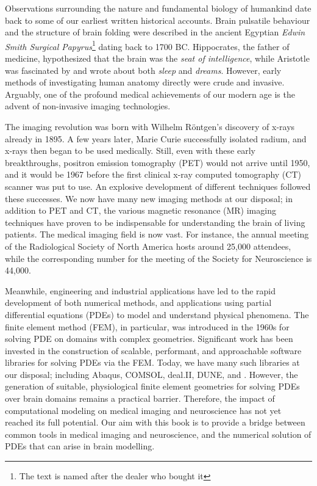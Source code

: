 %
%

\preface

Observations surrounding the nature and fundamental biology of
humankind date back to some of our earliest written historical
accounts.  Brain pulsatile behaviour and the structure of brain
folding were described in the ancient Egyptian \textit{Edwin Smith
Surgical Papyrus}\footnote{The text is named after the dealer who
bought it} dating back to 1700 BC.  Hippocrates, the father of
medicine, hypothesized that the brain was the \textit{seat of
intelligence}, while Aristotle was fascinated by and wrote about
both \textit{sleep} and \textit{dreams}. However, early methods of
investigating human anatomy directly were crude and invasive.
Arguably, one of the profound medical achievements of our modern age
is the advent of non-invasive imaging technologies.

The imaging revolution was born with Wilhelm Röntgen's discovery of
x-rays already in 1895. A few years later, Marie Curie successfully
isolated radium, and x-rays then began to be used medically. Still,
even with these early breakthroughs, positron emission tomography
(PET) would not arrive until 1950, and it would be 1967 before the
first clinical x-ray computed tomography (CT) scanner was put to use.
An explosive development of different techniques followed these
successes.  We now have many new imaging methods at our disposal; in
addition to PET and CT, the various magnetic resonance (MR) imaging
techniques have proven to be indispensable for understanding the brain
of living patients. The medical imaging field is now vast. For
instance, the annual meeting of the Radiological Society of North
America hosts around 25,000 attendees, while the corresponding number
for the meeting of the Society for Neuroscience is 44,000.

Meanwhile, engineering and industrial applications have led to the
rapid development of both numerical methods, and applications using
partial differential equations (PDEs) to model and understand physical
phenomena. The finite element method (FEM), in particular, was
introduced in the 1960s for solving PDE on domains with complex
geometries. Significant work has been invested in the construction of
scalable, performant, and approachable software libraries for solving
PDEs via the FEM. Today, we have many such libraries at our disposal;
including Abaqus, COMSOL, deal.II, DUNE, and {\fenics}. However, the
generation of suitable, physiological finite element geometries for
solving PDEs over brain domains remains a practical
barrier. Therefore, the impact of computational modeling on medical
imaging and neuroscience has not yet reached its full potential. Our
aim with this book is to provide a bridge between common tools in
medical imaging and neuroscience, and the numerical solution of PDEs
that can arise in brain modelling.

